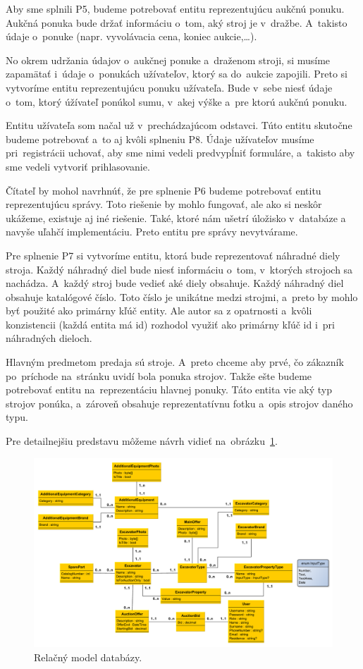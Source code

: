Aby sme splnili P5, budeme potrebovať entitu reprezentujúcu aukčnú ponuku. Aukčná ponuka bude držať informáciu o~tom, aký stroj je v~dražbe. A~takisto údaje o~ponuke (napr. vyvolávacia cena, koniec aukcie,\dots).

No okrem udržania údajov o~aukčnej ponuke a~draženom stroji, si musíme zapamätať i~údaje o~ponukách užívateľov, ktorý sa do~aukcie zapojili. Preto si vytvoríme entitu reprezentujúcu ponuku užívateľa. Bude v~sebe niesť údaje o~tom, ktorý úžívateľ ponúkol sumu, v~akej výške a~pre ktorú aukčnú ponuku.

Entitu užívateľa som načal už v~prechádzajúcom odstavci. Túto entitu skutočne budeme potrebovať a~to aj kvôli splneniu P8. Údaje užívateľov musíme pri~registrácii uchovať, aby sme nimi vedeli predvypĺniť formuláre, a~takisto aby sme vedeli vytvoriť prihlasovanie.

Čítateľ by mohol navrhnúť, že pre splnenie P6 budeme potrebovať entitu reprezentujúcu správy. Toto riešenie by mohlo fungovať, ale ako si neskôr ukážeme, existuje aj iné riešenie. Také, ktoré nám ušetrí úložisko v~databáze a navyše uľahčí implementáciu. Preto entitu pre správy nevytvárame.

Pre splnenie P7 si vytvoríme entitu, ktorá bude reprezentovať náhradné diely stroja. Každý náhradný diel bude niesť informáciu o~tom, v~ktorých strojoch sa nachádza. A~každý stroj bude vedieť aké diely obsahuje. Každý náhradný diel obsahuje katalógové číslo. Toto číslo je unikátne medzi strojmi, a~preto by mohlo byť použité ako primárny kľúč entity. Ale autor sa z opatrnosti a~kvôli konzistencii (každá entita má id) rozhodol využiť ako primárny kľúč id i~pri náhradných dieloch.

Hlavným predmetom predaja sú stroje. A~preto chceme aby prvé, čo zákazník po~príchode na~stránku uvidí bola ponuka strojov. Takže ešte budeme potrebovať entitu na~reprezentáciu hlavnej ponuky. Táto entita vie aký typ strojov ponúka, a~zároveň obsahuje reprezentatívnu fotku a~opis strojov daného typu.

Pre detailnejšiu predstavu môžeme návrh vidieť na~obrázku~\ref{relacny model uml}.

\begin{figure}[H]\centering
\includegraphics[width=140mm]{../img/relacny model uml}
\caption{Relačný model databázy.}
\label{relacny model uml}
\end{figure}

